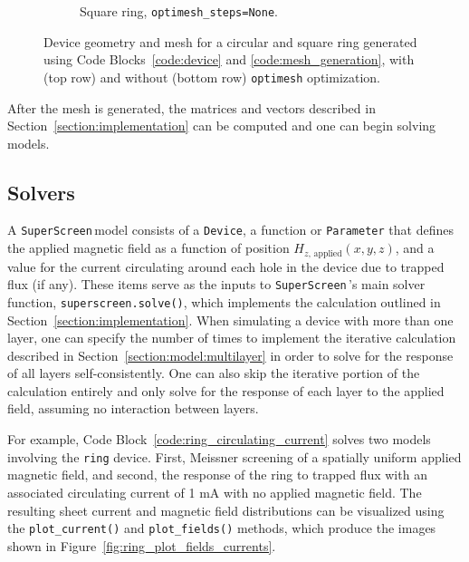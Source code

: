 \documentclass[preprint,12pt]{elsarticle}
\newcommand{\SuperScreen}{\texttt{SuperScreen}\,}
\begin{document}
\begin{figure}
\begin{subfigure}{.4\textwidth}
  \caption{Square ring, \texttt{optimesh_steps=None}.}
  \label{fig:square_ring_mesh_no_opt}
\end{subfigure}
\caption{Device geometry and mesh for a circular and square ring generated using Code Blocks~\ref{code:device} and \ref{code:mesh_generation}, with (top row) and without (bottom row) \texttt{optimesh} optimization.}
\label{fig:ring_mesh}
\end{figure}

After the mesh is generated, the matrices and vectors described in Section~\ref{section:implementation} can be computed and one can begin solving models.

\subsection{Solvers}
\label{section:overview:solvers}

A \SuperScreen model consists of a \texttt{Device}, a function or \texttt{Parameter} that defines the applied magnetic field as a function of position $H_{z,\,\mathrm{applied}}(x, y, z)$, and a value for the current circulating around each hole in the device due to trapped flux (if any). These items serve as the inputs to \SuperScreen's main solver function, \texttt{superscreen.solve()}, which implements the calculation outlined in Section~\ref{section:implementation}. When simulating a device with more than one layer, one can specify the number of times to implement the iterative calculation described in Section~\ref{section:model:multilayer} in order to solve for the response of all layers self-consistently. One can also skip the iterative portion of the calculation entirely and only solve for the response of each layer to the applied field, assuming no interaction between layers.

For example, Code Block~\ref{code:ring_circulating_current} solves two models involving the \texttt{ring} device. First, Meissner screening of a spatially uniform applied magnetic field, and second, the response of the ring to trapped flux with an associated circulating current of 1 mA with no applied magnetic field. The resulting sheet current and magnetic field distributions can be visualized using the \texttt{plot_current()} and \texttt{plot_fields()} methods, which produce the images shown in Figure~\ref{fig:ring_plot_fields_currents}.
\end{document}

